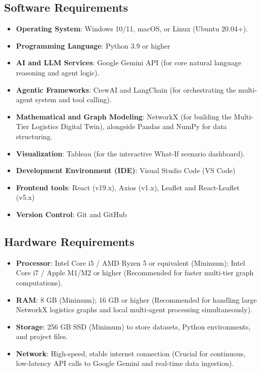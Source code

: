 \subsection[Software Requirements]{Software Requirements}
\begin{itemize}
    \item \textbf{Operating System}: Windows 10/11, macOS, or Linux (Ubuntu 20.04+).
    \item \textbf{Programming Language}: Python 3.9 or higher
    \item \textbf{AI and LLM Services}: Google Gemini API (for core natural language reasoning and agent logic).
    \item \textbf{Agentic Frameworks}: CrewAI and LangChain (for orchestrating the multi-agent system and tool calling).
    \item \textbf{Mathematical and Graph Modeling}: NetworkX (for building the Multi-Tier Logistics Digital Twin), alongside Pandas and NumPy for data structuring.
    \item \textbf{Visualization}: Tableau (for the interactive What-If scenario dashboard).
    \item \textbf{Development Environment (IDE)}: Visual Studio Code (VS Code)
    \item \textbf{Frontend tools}: React (v19.x), Axios (v1.x), Leaflet and React-Leaflet (v5.x)
    \item \textbf{Version Control}: Git and GitHub
\end{itemize}

\subsection[Hardware Requirements]{Hardware Requirements}
\begin{itemize}
    \item \textbf{Processor}: Intel Core i5 / AMD Ryzen 5 or equivalent (Minimum); Intel Core i7 / Apple M1/M2 or higher (Recommended for faster multi-tier graph computations).
\item \textbf{RAM}: 8 GB (Minimum); 16 GB or higher (Recommended for handling large NetworkX logistics graphs and local multi-agent processing simultaneously).
\item \textbf{Storage}: 256 GB SSD (Minimum) to store datasets, Python environments, and project files.
\item \textbf{Network}: High-speed, stable internet connection (Crucial for continuous, low-latency API calls to Google Gemini and real-time data ingestion).
\end{itemize}
